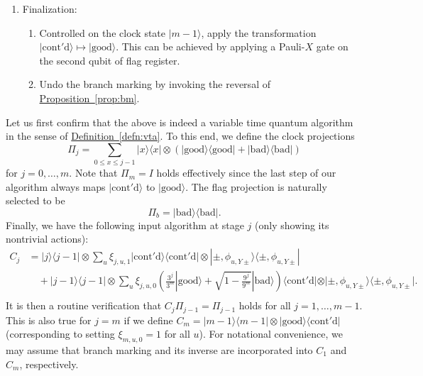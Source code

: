 \documentclass[letterpaper,onecolumn,11pt,accepted=2026-02-14]{quantumarticle}
\theoremstyle{remark}
\theoremstyle{plain}
\newcommand{\defn}[1]{\hyperref[defn:#1]{Definition~\ref*{defn:#1}}}
\newcommand{\prop}[1]{\hyperref[prop:#1]{Proposition~\ref*{prop:#1}}}
\newcommand{\ket}[1]{|#1\rangle}
\newcommand{\bra}[1]{\langle#1|}
\newcommand{\ketbra}[2]{\ket{#1}\!\bra{#2}}
\begin{document}
\begin{enumerate}
\begin{enumerate}
        \item Controlled on the flag state $\ket{\mathrm{cont'd}}$, increment the clock state $\ket{j}\mapsto\ket{j+1}$.
    \end{enumerate}
    \item Finalization:
    \begin{enumerate}
        \item Controlled on the clock state $\ket{m-1}$, apply the transformation $\ket{\mathrm{cont'd}}\mapsto\ket{\mathrm{good}}$. This can be achieved by applying a Pauli-$X$ gate on the second qubit of flag register.
        \item Undo the branch marking by invoking the reversal of \prop{bm}.
    \end{enumerate}
\end{enumerate}

Let us first confirm that the above is indeed a variable time quantum algorithm in the sense of \defn{vta}. To this end, we define the clock projections
\begin{equation}
    \Pi_j=\sum_{0\leq x\leq j-1}\ketbra{x}{x}\otimes\left(\ketbra{\mathrm{good}}{\mathrm{good}}+\ketbra{\mathrm{bad}}{\mathrm{bad}}\right)
\end{equation}
for $j=0,\ldots,m$. Note that $\Pi_m=I$ holds effectively since the last step of our algorithm always maps $\ket{\mathrm{cont'd}}$ to $\ket{\mathrm{good}}$. The flag projection is naturally selected to be
\begin{equation}
    \Pi_b=\ketbra{\mathrm{bad}}{\mathrm{bad}}.
\end{equation}
Finally, we have the following input algorithm at stage $j$ (only showing its nontrivial actions):
\begin{equation}
\begin{aligned}
    C_j&=\ketbra{j}{j-1}\otimes\sum_u\xi_{j,u,1}\ketbra{\mathrm{cont'd}}{\mathrm{cont'd}}\otimes\ketbra{\pm,\phi_{u,Y\pm}}{\pm,\phi_{u,Y\pm}}\\
    &\quad+\ketbra{j-1}{j-1}\otimes\sum_u\xi_{j,u,0}\left(\frac{3^j}{3^m}\ket{\mathrm{good}}+\sqrt{1-\frac{9^j}{9^m}}\ket{\mathrm{bad}}\right)\bra{\mathrm{cont'd}}\otimes\ketbra{\pm,\phi_{u,Y\pm}}{\pm,\phi_{u,Y\pm}}.\\
\end{aligned}
\end{equation}
It is then a routine verification that $C_j\Pi_{j-1}=\Pi_{j-1}$ holds for all $j=1,\ldots,m-1$. This is also true for $j=m$ if we define $C_m=\ketbra{m-1}{m-1}\otimes\ketbra{\mathrm{good}}{\mathrm{cont'd}}$ (corresponding to setting $\xi_{m,u,0}=1$ for all $u$). For notational convenience, we may assume that branch marking and its inverse are incorporated into $C_1$ and $C_m$, respectively.
\end{document}
